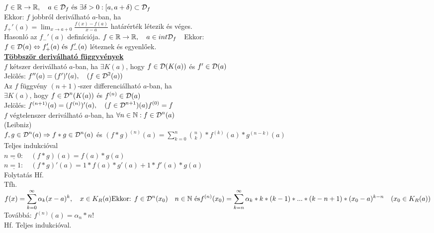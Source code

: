 \documentclass[a4paper,11pt]{article}
\begin{document}
 $f\in\displaystyle\mathbb{R}\to\mathbb{R},\quad a\in\displaystyle\mathcal{D}_f\text{  és  }\exists\delta>0:[a,a+\delta) \subset\displaystyle\mathcal{D}_f$\\[0.2cm]Ekkor: $f$ jobbról deriválható $a$-ban, ha\\[0.2cm] $f_+'(a)=\displaystyle\lim_{x\to a+0}\frac{f(x)-f(a)}{x-a}$ határérték létezik és véges.\\[0.2cm]Hasonló az $f_-'(a)$ definíciója.\newpage
\tetel $f\in\displaystyle\mathbb{R}\to\mathbb{R},\quad a\in int\displaystyle\mathcal{D}_f\quad$Ekkor:\\[0.2cm] $f\in\displaystyle\mathcal{D}(a)\Leftrightarrow f_+'(a)\text{  és  }f_-'(a)$ léteznek és egyenlőek.\\[0.3cm]
\textbf{\underline{Többször deriválható függyvények}}\\[0.2cm]
 $f$ kétszer deriválható $a$-ban, ha $\exists K(a)$, hogy $f\in\displaystyle\mathcal{D}(K(a))$ és $f'\in\displaystyle\mathcal{D}(a)$\\[0.2cm] Jelölés: $f''(a)=(f')'(a),\quad(f\in\displaystyle\mathcal{D}^2(a))$ \\[0.2cm] Az $f$ függvény $(n+1)$-szer differenciálható $a$-ban, ha 
\\[0.2cm]$\exists K(a)$, hogy $f\in\displaystyle\mathcal{D}^n(K(a))$ és $f^{(n)}\in\displaystyle\mathcal{D}(a)$\\[0.2cm] Jelölés: $f^{(n+1)}(a)=(f^{(n)})'(a),\quad(f\in\displaystyle\mathcal{D}^{n+1})(a)\\[0.1cm]f^{(0)}=f$
\\[0.2cm] $f$ végtelenszer deriválható $a$-ban, ha $\forall n\in\mathbb{N} :f\in\displaystyle\mathcal{D}^n(a)$\\[0.2cm]\tetel (Leibniz)\\[0.2cm] $f,g\in\displaystyle\mathcal{D}^n(a)\Rightarrow f*g\in\displaystyle\mathcal{D}^n(a)$ és $(f*g)^{(n)}(a)=\displaystyle\sum_{k=0}^{n}\binom{n}{k}*f^{(k)} (a)*g^{(n-k)}(a)$\\[0.2cm]\biz Teljes indukcióval\\[0.2cm]$\underline{n=0:}\quad (f*g) (a)=f(a)*g(a)$\\[0.2cm]$\underline{n=1:}\quad(f*g)'(a)=1*f(a)*g'(a)+1*f'(a)* g(a)$\\[0.2cm]Folytatás Hf.\\[0.4cm]\tetel Tfh. $f(x)=\displaystyle \sum_{k=0}^{\infty}\alpha_k(x-a)^k,\quad x\in K_R(a)\\[0.2cm]\text{Ekkor: } f\in\displaystyle\mathcal{D}^n(x_0) \quad n\in\mathbb{N}\text{  és}\\[0.2cm]f^{(n)}(x_0)=\sum_{k=n}^{\infty} \alpha_k*k*(k-1)*...*(k-n+1)*(x_0-a)^{k-n}\quad(x_0\in K_R(a))$\\[0.4cm]Továbbá: $f^{(n)}(a)=\alpha_n*n!$\\[0.2cm]\biz Hf. Teljes indukcióval.
\end{document}
